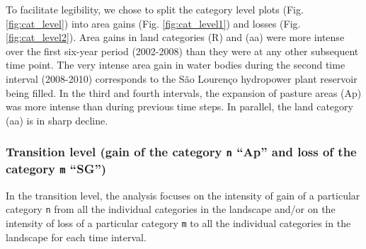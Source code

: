 To facilitate legibility, we chose to split the category level plots
(Fig. \ref{fig:cat_level}) into area gains (Fig. \ref{fig:cat_level1})
and losses (Fig. \ref{fig:cat_level2}). Area gains in land categories (R)
and (aa) were more intense over the first six-year period (2002-2008) than
they were at any other subsequent time point. The very intense area gain
in water bodies during the second time interval (2008-2010) corresponds
to the São Lourenço hydropower plant reservoir being filled. In the
third and fourth intervals, the expansion of pasture areas (Ap) was more
intense than during previous time steps. In parallel, the land category
(aa) is in sharp decline.

\hypertarget{transition-level-gain-of-the-category-n-ap-and-loss-of-the-category-m-sg}{%
\subsubsection{\texorpdfstring{Transition level (gain of the category
\texttt{n} ``Ap'' and loss of the category \texttt{m}
``SG'')}{Transition Level (Gain of the category n ``Ap'' and Loss of the category m ``SG'')}}\label{transition-level-gain-of-the-category-n-ap-and-loss-of-the-category-m-sg}}

In the transition level, the analysis focuses on the intensity of gain
of a particular category \texttt{n} from all the individual categories
in the landscape and/or on the intensity of loss of a particular
category \texttt{m} to all the individual categories in the landscape
for each time interval.

